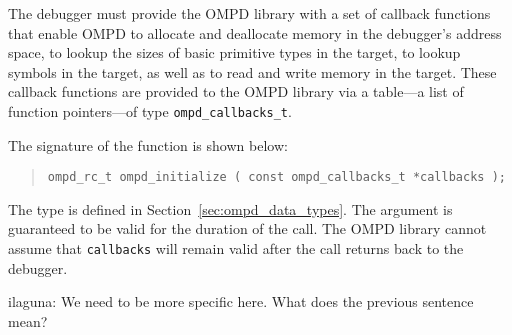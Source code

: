 The debugger must provide the OMPD library with a set of callback functions 
that enable OMPD to allocate and deallocate memory in the debugger's address 
space, to lookup the sizes of basic primitive types in the target, to lookup 
symbols in the target, as well as to read and write memory in the target. These 
callback functions are provided to the OMPD library via a table---a list of 
function pointers---of type \texttt{ompd\_callbacks\_t}.

The signature of the function is shown below:

\begin{quote}
\begin{lstlisting}
ompd_rc_t ompd_initialize ( const ompd_callbacks_t *callbacks );
\end{lstlisting}
\end{quote}

\noindent
The type  is defined in
Section~\ref{sec:ompd_data_types}. 
The argument is guaranteed to be valid for the duration of the call.
The OMPD library cannot assume that \texttt{callbacks} will remain valid
after the call returns back to the debugger.
\begin{notes}
ilaguna: We need to be more specific here. What does the previous sentence 
mean?	
\end{notes}





